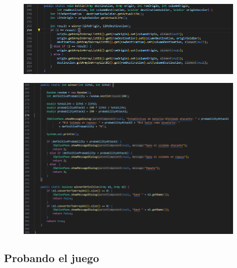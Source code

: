 \documentclass{article}
\begin{document}
	
	
	\begin{figure}[H]
		\centering
		\includegraphics[width=1\textwidth,keepaspectratio]{img/battle.png}
	\end{figure}
	
	
	
		\begin{figure}[H]
		\centering
		\includegraphics[width=1\textwidth,keepaspectratio]{img/winner.png}
	\end{figure}
	
	
	
	\subsection{Probando el juego}
	
	
	
\end{document}
